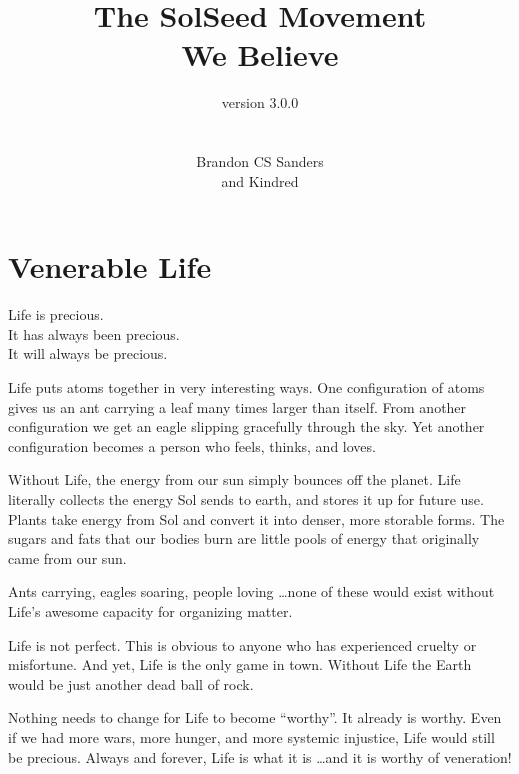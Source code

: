 \documentclass[ebook,12pt,openany,twoside]{memoir}
\newcommand{\tab}{\hspace*{2em}}
\newcommand{\imagefacingchapter}[1]{
  \cleartoverso
  \clearpage \null
  \thispagestyle{cleared}
  \AddToShipoutPictureBG*{%
    \AtStockLowerLeft{%
      \texttt{[image: \#1]}
    }
  }
  \clearpage
}
\begin{document}
\title{\tiny{The SolSeed Movement}\\\large{\textbf{We Believe}}}
\author{\tiny{version 3.0.0}\\ \\ \\Brandon CS Sanders\\\small{and Kindred}}
\begin{titlingpage}
\maketitle
\end{titlingpage}



\pagestyle{plain}
\imagefacingchapter{images/VenerableLife}
\chapter{Venerable Life}

\setlength\epigraphwidth{2.25in}
\epigraph{
  Life is precious.\\
  \tab It has always been precious.\\
  \tab It will always be precious.
}{}

\noindent Life puts atoms together in very interesting ways. One configuration
of atoms gives us an ant carrying a leaf many times larger than itself. From
another configuration we get an eagle slipping gracefully through the sky. Yet
another configuration becomes a person who feels, thinks, and loves.

Without Life, the energy from our sun simply bounces off the planet. Life
literally collects the energy Sol sends to earth, and stores it up for future
use. Plants take energy from Sol and convert it into denser, more storable
forms. The sugars and fats that our bodies burn are little pools of energy that
originally came from our sun.

Ants carrying, eagles soaring, people loving \ldots none of these would exist
without Life's awesome capacity for organizing matter.

Life is not perfect. This is obvious to anyone who has experienced cruelty or
misfortune. And yet, Life is the only game in town. Without Life the Earth
would be just another dead ball of rock.

Nothing needs to change for Life to become ``worthy''. It already is worthy.
Even if we had more wars, more hunger, and more systemic injustice, Life would
still be precious. Always and forever, Life is what it is \ldots and it
is worthy of veneration!
\end{document}
